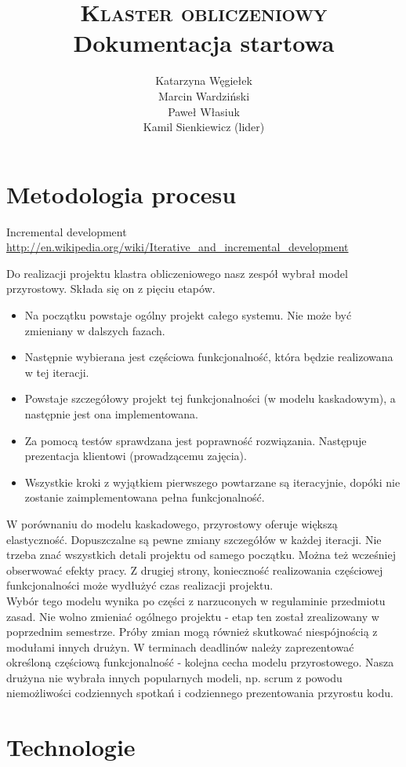 \documentclass[a4paper]{article}
\title{\textsc{Klaster obliczeniowy}\\Dokumentacja startowa}
\author{Katarzyna Węgiełek\\Marcin Wardziński\\Paweł Własiuk\\Kamil Sienkiewicz (lider)}
\begin{document}
	\maketitle
	
	\section{Metodologia procesu}
	Incremental development \url{http://en.wikipedia.org/wiki/Iterative_and_incremental_development}
	
	Do realizacji projektu klastra obliczeniowego nasz zespół wybrał model przyrostowy. Składa się on z pięciu etapów.
	\begin{itemize}
		\item Na początku powstaje ogólny projekt całego systemu. Nie może być zmieniany w dalszych fazach.
		\item Następnie wybierana jest częściowa funkcjonalność, która będzie realizowana w tej iteracji.
		\item Powstaje szczegółowy projekt tej funkcjonalności (w modelu kaskadowym), a następnie jest ona implementowana.
		\item Za pomocą testów sprawdzana jest poprawność rozwiązania. Następuje prezentacja klientowi (prowadzącemu zajęcia).
		\item Wszystkie kroki z wyjątkiem pierwszego powtarzane są iteracyjnie, dopóki nie zostanie zaimplementowana pełna funkcjonalność.
	\end{itemize}
	
	
	W porównaniu do modelu kaskadowego, przyrostowy oferuje większą elastyczność. Dopuszczalne są pewne zmiany szczegółów w każdej iteracji. Nie trzeba znać wszystkich detali projektu od samego początku. Można też wcześniej obserwować efekty pracy. Z drugiej strony, konieczność realizowania częściowej funkcjonalności może wydłużyć czas realizacji projektu.\\
	
	
	
	Wybór tego modelu wynika po części z narzuconych w regulaminie przedmiotu zasad. Nie wolno zmieniać ogólnego projektu - etap ten został zrealizowany w poprzednim semestrze. Próby zmian mogą również skutkować niespójnością z modułami innych drużyn. W terminach deadlinów należy zaprezentować określoną częściową funkcjonalność - kolejna cecha modelu przyrostowego. Nasza drużyna nie wybrała innych popularnych modeli, np. scrum z powodu niemożliwości codziennych spotkań i codziennego prezentowania przyrostu kodu. 
	\section{Technologie}
	
\end{document}
